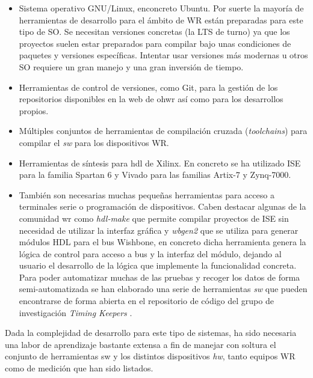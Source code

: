 \begin{itemize}
	\item Sistema operativo GNU/Linux, enconcreto Ubuntu. Por suerte la mayoría 
	de herramientas de desarrollo para el ámbito de WR están preparadas para 
	este tipo de SO. Se necesitan versiones concretas (la LTS de turno) ya que 
	los proyectos suelen estar preparados para compilar bajo unas condiciones 
	de paquetes y versiones específicas. Intentar usar versiones más modernas u 
	otros SO requiere un gran manejo y una gran inversión de tiempo.
	
	\item Herramientas de control de versiones, como Git, para la gestión de 
	los repositorios disponibles en la web de \gls{ohwr} \cite{website:ohwr} 
	así como para los desarrollos propios.
	
	\item Múltiples conjuntos de herramientas de compilación cruzada 
	(\textit{toolchains}) para compilar el \textit{sw} para los dispositivos WR.
	
	\item Herramientas de síntesis para \gls{hdl} de Xilinx. En concreto se ha 
	utilizado ISE para la familia Spartan 6 y Vivado para las familias Artix-7 
	y Zynq-7000.
	
	\item También son necesarias muchas pequeñas herramientas para acceso a 
	terminales serie o programación de dispositivos. Caben destacar algunas de 
	la comunidad \gls{wr} como \textit{hdl-make} que permite compilar proyectos 
	de ISE sin necesidad de utilizar la interfaz gráfica y \textit{wbgen2} que 
	se utiliza para generar módulos HDL para el bus Wishbone, en concreto dicha 
	herramienta genera la lógica de control para acceso a bus y la interfaz del 
	módulo, dejando al usuario el desarrollo de la lógica que implemente la 
	funcionalidad concreta. Para poder automatizar muchas de las pruebas y 
	recoger los datos de forma semi-automatizada se han elaborado una serie de 
	herramientas \textit{sw} que pueden encontrarse de forma abierta en el 
	repositorio de código del grupo de investigación \textit{Timing Keepers} 
	\cite{website:github}.
\end{itemize}

Dada la complejidad de desarrollo para este tipo de sistemas, ha sido necesaria 
una labor de aprendizaje bastante extensa a fin de manejar con soltura el 
conjunto de herramientas sw y los distintos dispositivos \textit{hw}, tanto 
equipos WR como de medición que han sido listados.